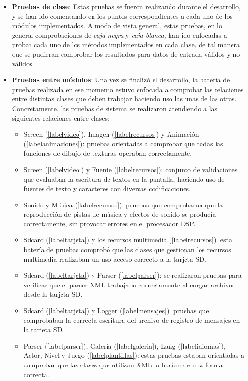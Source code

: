 \begin{itemize}
\item \textbf{Pruebas de clase}: Estas pruebas se fueron realizando durante el desarrollo, y se han ido comentando en los puntos correspondientes a cada uno de los módulos implementados. A modo de vista general, estas pruebas, en lo general comprobaciones de \emph{caja negra} y  \emph{caja blanca}, han ido enfocadas a probar cada uno de los métodos implementados en cada clase, de tal manera que se pudieran comprobar los resultados para datos de entrada válidos y no válidos.
\item \textbf{Pruebas entre módulos}: Una vez se finalizó el desarrollo, la batería de pruebas realizada en ese momento estuvo enfocada a comprobar las relaciones entre distintas clases que deben trabajar haciendo uso las unas de las otras.\\
Concretamente, las pruebas de sistema se realizaron atendiendo a las siguientes relaciones entre clases:
	\begin{itemize}
	\item Screen (\ref{labelvideo}), Imagen (\ref{labelrecursos}) y Animación (\ref{labelanimaciones}): pruebas orientadas a comprobar que todas las funciones de dibujo de texturas operaban correctamente.
	\item Screen (\ref{labelvideo}) y Fuente (\ref{labelrecursos}): conjunto de validaciones que evaluaban la escritura de textos en la pantalla, haciendo uso de fuentes de texto y caracteres con diversas codificaciones.
	\item Sonido y Música (\ref{labelrecursos}): pruebas que comprobaron que la reproducción de pistas de música y efectos de sonido se producía correctamente, sin provocar errores en el procesador DSP.
	\item Sdcard (\ref{labeltarjeta}) y los recursos multimedia (\ref{labelrecursos}): esta batería de pruebas comprobó que las clases que gestionan los recursos multimedia realizaban un uso acceso correcto a la tarjeta SD.
	\item Sdcard (\ref{labeltarjeta}) y Parser (\ref{labelparser}): se realizaron pruebas para verificar que el parser XML trabajaba correctamente al cargar archivos desde la tarjeta SD.
	\item Sdcard (\ref{labeltarjeta}) y Logger (\ref{labelmensajes}): pruebas que comprobaban la correcta escritura del archivo de registro de mensajes en la tarjeta SD.
	\item Parser (\ref{labelparser}), Galería (\ref{labelgaleria}), Lang (\ref{labelidiomas}), Actor, Nivel y Juego (\ref{labelplantillas}): estas pruebas estaban orientadas a comprobar que las clases que utilizan XML lo hacían de una forma correcta.

\end{itemize}
\end{itemize}
